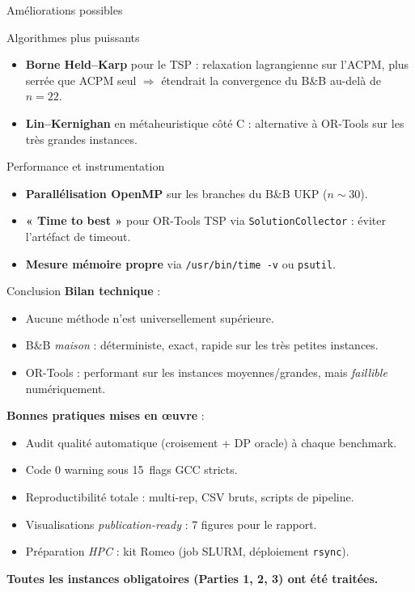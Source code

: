 \documentclass[aspectratio=169, 11pt]{beamer}
\begin{document}
\begin{frame}{Améliorations possibles}
\begin{block}{Algorithmes plus puissants}
\begin{itemize}
  \item \textbf{Borne Held--Karp} pour le TSP : relaxation lagrangienne sur l'ACPM, plus serrée que ACPM seul $\Rightarrow$ étendrait la convergence du B\&B au-delà de $n = 22$.
  \item \textbf{Lin--Kernighan} en métaheuristique côté C : alternative à OR-Tools sur les très grandes instances.
\end{itemize}
\end{block}

\begin{block}{Performance et instrumentation}
\begin{itemize}
  \item \textbf{Parallélisation OpenMP} sur les branches du B\&B UKP ($n \sim 30$).
  \item \textbf{« Time to best »} pour OR-Tools TSP via \texttt{SolutionCollector} : éviter l'artéfact de timeout.
  \item \textbf{Mesure mémoire propre} via \texttt{/usr/bin/time -v} ou \texttt{psutil}.
\end{itemize}
\end{block}
\end{frame}

\begin{frame}{Conclusion}
\textbf{Bilan technique} :
\begin{itemize}
  \item \alert{Aucune méthode n'est universellement supérieure}.
  \item B\&B \emph{maison} : déterministe, exact, rapide sur les très petites instances.
  \item OR-Tools : performant sur les instances moyennes/grandes, mais \emph{faillible} numériquement.
\end{itemize}

\textbf{Bonnes pratiques mises en œuvre} :
\begin{itemize}
  \item Audit qualité \alert{automatique} (croisement + DP oracle) à chaque benchmark.
  \item Code \alert{0 warning} sous 15~flags GCC stricts.
  \item Reproductibilité totale : multi-rep, CSV bruts, scripts de pipeline.
  \item Visualisations \emph{publication-ready} : 7 figures pour le rapport.
  \item Préparation \emph{HPC} : kit Romeo (job SLURM, déploiement \texttt{rsync}).
\end{itemize}

\vspace{0.5em}
\centering
\textbf{Toutes les instances obligatoires (Parties 1, 2, 3) ont été traitées.}
\end{frame}
\end{document}
